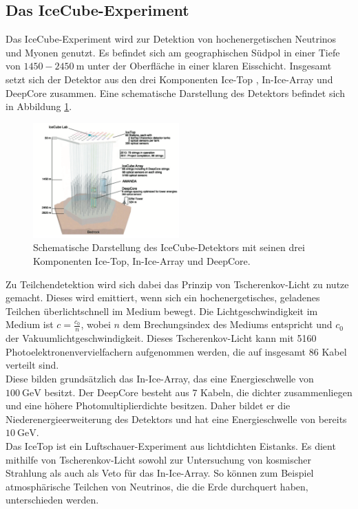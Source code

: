 \subsection{Das IceCube-Experiment}
Das IceCube-Experiment wird zur Detektion von hochenergetischen Neutrinos und Myonen genutzt. Es befindet sich am geographischen Südpol in einer Tiefe von $1450-\SI{2450}{\meter}$ unter der Oberfläche in einer klaren Eisschicht. Insgesamt setzt sich der Detektor aus den drei Komponenten Ice-Top \cite{3246225}, In-Ice-Array \cite{ACHTERBERG2006155} und DeepCore \cite{2143409} zusammen. Eine schematische Darstellung des Detektors befindet sich in Abbildung \ref{fig:Ice}.
\begin{figure}
  \centering
  \includegraphics[width=0.5\textwidth]{graphics/IceCube.png}
  \caption{Schematische Darstellung des IceCube-Detektors mit seinen drei Komponenten Ice-Top, In-Ice-Array und DeepCore.\cite{IceCube}}
  \label{fig:Ice}
\end{figure}
Zu Teilchendetektion wird sich dabei das Prinzip von Tscherenkov-Licht zu nutze gemacht. Dieses wird emittiert, wenn sich ein hochenergetisches, geladenes Teilchen überlichtschnell im Medium bewegt. Die Lichtgeschwindigkeit im Medium ist $c=\frac{c_{0}}{n}$, wobei $n$ dem Brechungsindex des Mediums entspricht und $c_{0}$ der Vakuumlichtgeschwindigkeit. Dieses Tscherenkov-Licht kann mit 5160 Photoelektronenvervielfachern aufgenommen werden, die auf insgesamt 86 Kabel verteilt sind.\\
Diese bilden grundsätzlich das In-Ice-Array, das eine Energieschwelle von $\SI{100}{\giga\electronvolt}$ besitzt. Der DeepCore besteht aus 7 Kabeln, die dichter zusammenliegen und eine höhere Photomultiplierdichte besitzen. Daher bildet er die Niederenergieerweiterung des Detektors und hat eine Energieschwelle von bereits $\SI{10}{\giga\electronvolt}$.\\
Das IceTop ist ein Luftschauer-Experiment aus lichtdichten Eistanks. Es dient mithilfe von Tscherenkov-Licht sowohl zur Untersuchung von kosmischer Strahlung als auch als Veto für das In-Ice-Array. So können zum Beispiel atmosphärische Teilchen von Neutrinos, die die Erde durchquert haben, unterschieden werden.\\
